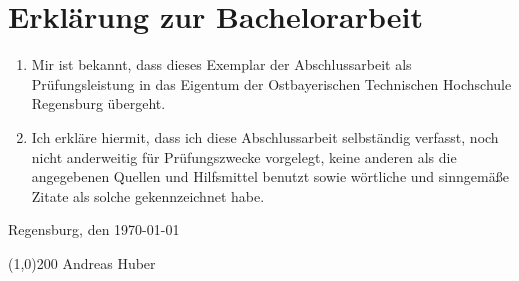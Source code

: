 \thispagestyle{empty}
\section*{Erklärung zur Bachelorarbeit}

\bigskip
\bigskip 
\bigskip 

\begin{enumerate}
    \item Mir ist bekannt, dass dieses Exemplar der Abschlussarbeit als Prüfungsleistung in das Eigentum der Ostbayerischen Technischen Hochschule Regensburg übergeht.
    \item Ich erkläre hiermit, dass ich diese Abschlussarbeit selbständig verfasst, noch nicht anderweitig für Prüfungszwecke vorgelegt, keine anderen als die angegebenen Quellen und Hilfsmittel benutzt sowie wörtliche und sinngemäße Zitate als solche gekennzeichnet habe.
\end{enumerate}

\bigskip 
\bigskip 
\bigskip 

\noindent Regensburg, den \today

\bigskip 
\bigskip

\noindent\line(1,0){200}
\newline
\noindent Andreas Huber